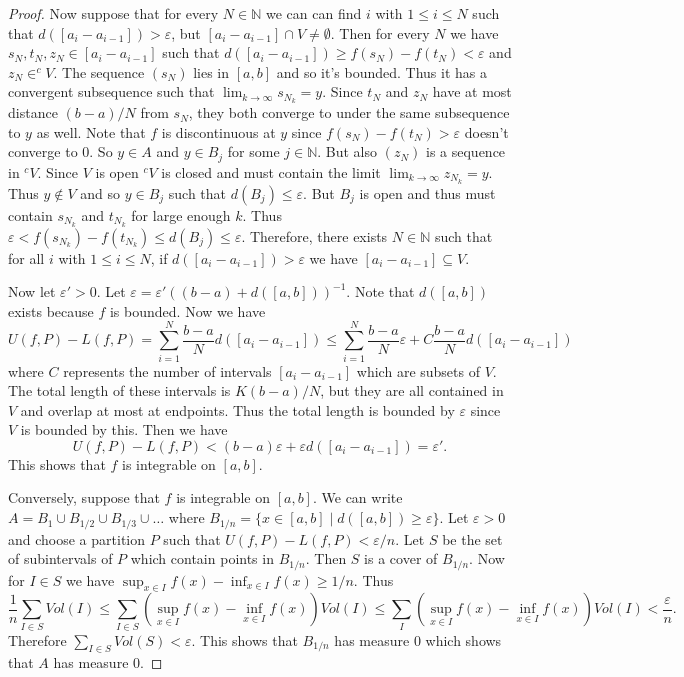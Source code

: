 \documentclass{article}
\begin{document}
\begin{flushleft}
\begin{proof}
Now suppose that for every $N \in \mathbb{N}$ we can can find $i$ with $1 \leq i \leq N$ such that $d([a_i-a_{i-1}]) > \varepsilon$, but $[a_i-a_{i-1}] \cap V \neq \emptyset$. Then for every $N$ we have $s_N, t_N, z_N \in [a_i-a_{i-1}]$ such that $d([a_i-a_{i-1}]) \geq f(s_N) - f(t_N) < \varepsilon$ and $z_N \in ^c V$. The sequence $(s_N)$ lies in $[a,b]$ and so it's bounded. Thus it has a convergent subsequence such that $\lim_{k \rightarrow \infty} s_{N_k} = y$. Since $t_N$ and $z_N$ have at most distance $(b-a)/N$ from $s_N$, they both converge to under the same subsequence to $y$ as well. Note that $f$ is discontinuous at $y$ since $f(s_N) - f(t_N) > \varepsilon$ doesn't converge to $0$. So $y \in A$ and $y \in B_j$ for some $j \in \mathbb{N}$. But also $(z_N)$ is a sequence in $^c V$. Since $V$ is open $^c V$ is closed and must contain the limit $\lim_{k \rightarrow \infty} z_{N_k} = y$. Thus $y \notin V$ and so $y \in B_j$ such that $d(B_j) \leq \varepsilon$. But $B_j$ is open and thus must contain $s_{N_k}$ and $t_{N_k}$ for large enough $k$. Thus $\varepsilon < f(s_{N_k}) - f(t_{N_k}) \leq d(B_j) \leq \varepsilon$. Therefore, there exists $N \in \mathbb{N}$ such that for all $i$ with $1 \leq i \leq N$, if $d([a_i-a_{i-1}]) > \varepsilon$ we have $[a_i-a_{i-1}] \subseteq V$.\newline

Now let $\varepsilon' > 0$. Let $\varepsilon = \varepsilon' ((b-a) + d([a,b]))^{-1}$. Note that $d([a,b])$ exists because $f$ is bounded. Now we have
\[
U(f,P) - L(f,P) = \sum_{i=1}^{N} \frac{b-a}{N} d([a_i-a_{i-1}]) \leq \sum_{i=1}^{N} \frac{b-a}{N} \varepsilon + C \frac{b-a}{N} d([a_i-a_{i-1}])
\]
where $C$ represents the number of intervals $[a_i-a_{i-1}]$ which are subsets of $V$. The total length of these intervals is $K (b-a)/N$, but they are all contained in $V$ and overlap at most at endpoints. Thus the total length is bounded by $\varepsilon$ since $V$ is bounded by this. Then we have
\[
U(f,P) - L(f,P) < (b-a) \varepsilon + \varepsilon d([a_i-a_{i-1}]) = \varepsilon'.
\]
This shows that $f$ is integrable on $[a,b]$.\newline

Conversely, suppose that $f$ is integrable on $[a,b]$. We can write $A = B_{1} \cup B_{1/2} \cup B_{1/3} \cup \dots$ where $B_{1/n} = \{x \in [a,b] \mid d([a,b]) \geq \varepsilon\}$. Let $\varepsilon > 0$ and choose a partition $P$ such that $U(f,P) - L(f,P) < \varepsilon/n$. Let $S$ be the set of subintervals of $P$ which contain points in $B_{1/n}$. Then $S$ is a cover of $B_{1/n}$. Now for $I \in S$ we have $\sup_{x \in I} f(x) - \inf_{x \in I} f(x) \geq 1/n$. Thus
\[
\frac{1}{n} \sum_{I \in S} Vol(I) \leq \sum_{I \in S} \left ( \sup_{x \in I} f(x) - \inf_{x \in I} f(x) \right ) Vol(I) \leq \sum_{I} \left ( \sup_{x \in I} f(x) - \inf_{x \in I} f(x) \right ) Vol(I) < \frac{\varepsilon}{n}.
\]
Therefore $\sum_{I \in S} Vol(S) < \varepsilon$. This shows that $B_{1/n}$ has measure $0$ which shows that $A$ has measure $0$.
\end{proof}



\end{flushleft}
\end{document}
